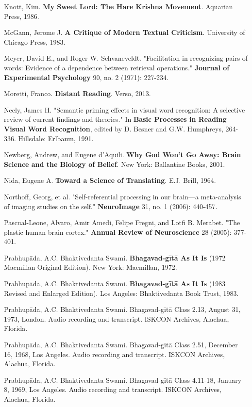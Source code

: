 \documentclass[11pt,twoside]{book}
\begin{document}
Knott, Kim. \textbf{My Sweet Lord: The Hare Krishna Movement}. Aquarian Press, 1986.

McGann, Jerome J. \textbf{A Critique of Modern Textual Criticism}. University of Chicago Press, 1983.

Meyer, David E., and Roger W. Schvaneveldt. "Facilitation in recognizing pairs of words: Evidence of a dependence between retrieval operations." \textbf{Journal of Experimental Psychology} 90, no. 2 (1971): 227-234.

Moretti, Franco. \textbf{Distant Reading}. Verso, 2013.

Neely, James H. "Semantic priming effects in visual word recognition: A selective review of current findings and theories." In \textbf{Basic Processes in Reading Visual Word Recognition}, edited by D. Besner and G.W. Humphreys, 264-336. Hillsdale: Erlbaum, 1991.

Newberg, Andrew, and Eugene d'Aquili. \textbf{Why God Won't Go Away: Brain Science and the Biology of Belief}. New York: Ballantine Books, 2001.

Nida, Eugene A. \textbf{Toward a Science of Translating}. E.J. Brill, 1964.

Northoff, Georg, et al. "Self-referential processing in our brain—a meta-analysis of imaging studies on the self." \textbf{NeuroImage} 31, no. 1 (2006): 440-457.

Pascual-Leone, Alvaro, Amir Amedi, Felipe Fregni, and Lotfi B. Merabet. "The plastic human brain cortex." \textbf{Annual Review of Neuroscience} 28 (2005): 377-401.

Prabhupāda, A.C. Bhaktivedanta Swami. \textbf{Bhagavad-gītā As It Is} (1972 Macmillan Original Edition). New York: Macmillan, 1972.

Prabhupāda, A.C. Bhaktivedanta Swami. \textbf{Bhagavad-gītā As It Is} (1983 Revised and Enlarged Edition). Los Angeles: Bhaktivedanta Book Trust, 1983.

Prabhupāda, A.C. Bhaktivedanta Swami. Bhagavad-gītā Class 2.13, August 31, 1973, London. Audio recording and transcript. ISKCON Archives, Alachua, Florida.

Prabhupāda, A.C. Bhaktivedanta Swami. Bhagavad-gītā Class 2.51, December 16, 1968, Los Angeles. Audio recording and transcript. ISKCON Archives, Alachua, Florida.

Prabhupāda, A.C. Bhaktivedanta Swami. Bhagavad-gītā Class 4.11-18, January 8, 1969, Los Angeles. Audio recording and transcript. ISKCON Archives, Alachua, Florida.
\end{document}
